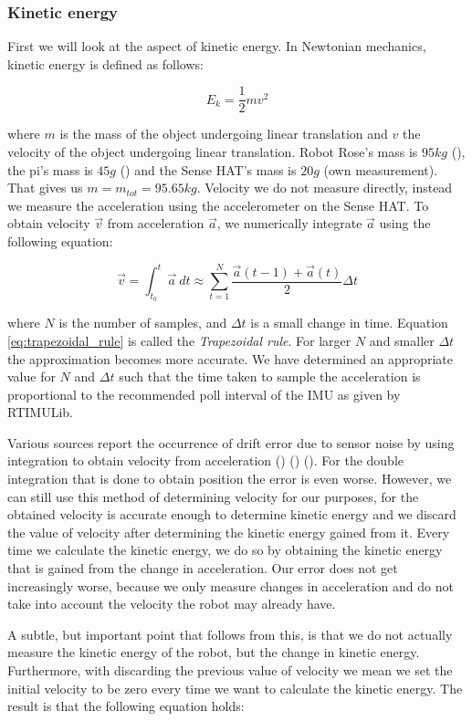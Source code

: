 \documentclass[12pt]{scrreprt}
\begin{document}
\subsubsection{Kinetic energy}
\label{Kinetic energy}
First we will look at the aspect of kinetic energy. In Newtonian mechanics, kinetic energy is defined as follows:

\begin{equation} \label{eq:ke}
    E_k = \frac{1}{2}mv^2
\end{equation}

where $m$ is the mass of the object undergoing linear translation and $v$ the velocity of the object undergoing linear translation. Robot Rose's mass is $95kg$ (\cite{rose_specification}), the \gls{pi}'s mass is $45g$ (\cite{raspberry_pi_weight}) and the Sense HAT's mass is $20g$ (own measurement). That gives us $m = m_{tot} = 95.65kg$. Velocity we do not measure directly, instead we measure the acceleration using the accelerometer on the Sense HAT. To obtain velocity $\vec{v}$ from acceleration $\vec{a}$, we numerically integrate $\vec{a}$ using the following equation:

\begin{equation} \label{eq:trapezoidal_rule}
    \vec{v} = \int_{t_0}^t \vec{a}\ dt \approx \sum_{t=1}^{N} \frac{\vec{a}(t-1) + \vec{a}(t)}{2}\Delta t
\end{equation}

where $N$ is the number of samples, and $\Delta t$ is a small change in time. Equation \ref{eq:trapezoidal_rule} is called the \textit{Trapezoidal rule}. For larger $N$ and smaller $\Delta t$ the approximation becomes more accurate. We have determined an appropriate value for $N$ and $\Delta t$ such that the time taken to sample the acceleration is proportional to the recommended poll interval of the IMU as given by RTIMULib.
\par
Various sources report the occurrence of drift error due to sensor noise by using integration to obtain velocity from acceleration (\cite{chrobotics}) (\cite{googletechtalks}) (\cite{Woodman07anintroduction_oliver}). For the double integration that is done to obtain position the error is even worse. However, we can still use this method of determining velocity for our purposes, for the obtained velocity is accurate enough to determine kinetic energy and we discard the value of velocity after determining the kinetic energy gained from it. Every time we calculate the kinetic energy, we do so by obtaining the kinetic energy that is gained from the change in acceleration. Our error does not get increasingly worse, because we only measure changes in acceleration and do not take into account the velocity the robot may already have.
\par
A subtle, but important point that follows from this, is that we do not actually measure the kinetic energy of the robot, but the change in kinetic energy. Furthermore, with discarding the previous value of velocity we mean we set the initial velocity to be zero every time we want to calculate the kinetic energy. The result is that the following equation holds:
\\\\
\end{document}

